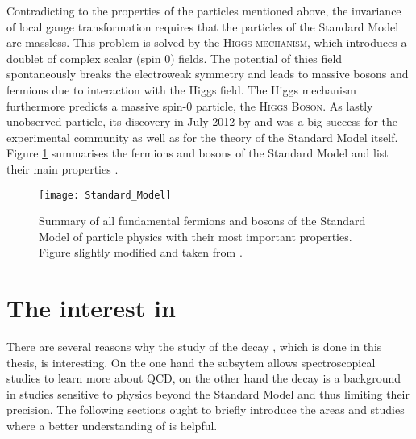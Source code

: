 Contradicting to the properties of the particles mentioned above, the invariance of local gauge transformation requires that the particles of the Standard Model are massless.
This problem is solved by the \textsc{Higgs mechanism}, which introduces a doublet of complex scalar (spin 0) fields.
The potential of thies field spontaneously breaks the electroweak symmetry and leads to massive bosons and fermions due to interaction with the Higgs field.
The Higgs mechanism furthermore predicts a massive spin-0 particle, the \textsc{Higgs Boson}.
As lastly unobserved particle, its discovery in July 2012 by \atlas \cite{Higgs_ATLAS} and \cms \cite{Higgs_CMS} was a big success for the experimental community as well as for the theory of the Standard Model itself. 
Figure \ref{fig:SM} summarises the fermions and bosons of the Standard Model and list their main properties \cite{Perkins_HEP, Burgess_SM, Meissner}.
\begin{figure}[ptb]
    \centering
	\texttt{[image: Standard\_Model]}	
	\caption{Summary of all fundamental fermions and bosons of the Standard Model of particle physics with their most important properties. Figure slightly modified and taken from \cite{SM_figure}.}
	\label{fig:SM}
\end{figure}

\section{The interest in \LbToDpmunuX}
There are several reasons why the study of the decay \LbToDpmunuX, which is done in this thesis, is interesting.
On the one hand the \Dz\proton subsytem allows spectroscopical studies to learn more about QCD, on the other hand the decay is a background in studies sensitive to physics beyond the Standard Model and thus limiting their precision.
The following sections ought to briefly introduce the areas and studies where a better understanding of \LbToDpmunuX is helpful.

